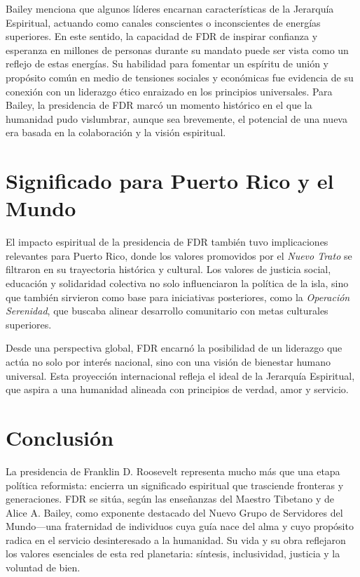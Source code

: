 \documentclass[
]{book}
\begin{document}
Bailey menciona que algunos líderes encarnan características de la Jerarquía Espiritual, actuando como canales conscientes o inconscientes de energías superiores. En este sentido, la capacidad de FDR de inspirar confianza y esperanza en millones de personas durante su mandato puede ser vista como un reflejo de estas energías. Su habilidad para fomentar un espíritu de unión y propósito común en medio de tensiones sociales y económicas fue evidencia de su conexión con un liderazgo ético enraizado en los principios universales. Para Bailey, la presidencia de FDR marcó un momento histórico en el que la humanidad pudo vislumbrar, aunque sea brevemente, el potencial de una nueva era basada en la colaboración y la visión espiritual.

\section{Significado para Puerto Rico y el Mundo}\label{significado-para-puerto-rico-y-el-mundo}

El impacto espiritual de la presidencia de FDR también tuvo implicaciones relevantes para Puerto Rico, donde los valores promovidos por el \emph{Nuevo Trato} se filtraron en su trayectoria histórica y cultural. Los valores de justicia social, educación y solidaridad colectiva no solo influenciaron la política de la isla, sino que también sirvieron como base para iniciativas posteriores, como la \emph{Operación Serenidad}, que buscaba alinear desarrollo comunitario con metas culturales superiores.

Desde una perspectiva global, FDR encarnó la posibilidad de un liderazgo que actúa no solo por interés nacional, sino con una visión de bienestar humano universal. Esta proyección internacional refleja el ideal de la Jerarquía Espiritual, que aspira a una humanidad alineada con principios de verdad, amor y servicio.

\section{Conclusión}\label{conclusiuxf3n-2}

La presidencia de Franklin D. Roosevelt representa mucho más que una etapa política reformista: encierra un significado espiritual que trasciende fronteras y generaciones. FDR se sitúa, según las enseñanzas del Maestro Tibetano y de Alice A. Bailey, como exponente destacado del Nuevo Grupo de Servidores del Mundo---una fraternidad de individuos cuya guía nace del alma y cuyo propósito radica en el servicio desinteresado a la humanidad. Su vida y su obra reflejaron los valores esenciales de esta red planetaria: síntesis, inclusividad, justicia y la voluntad de bien.
\end{document}
